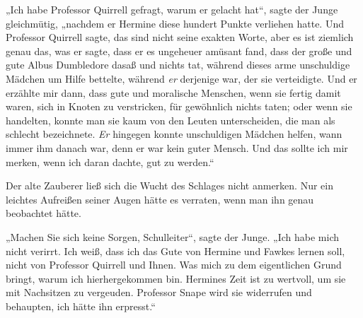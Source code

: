 „Ich habe Professor Quirrell gefragt, warum er gelacht hat“, sagte der Junge gleichmütig, „nachdem er Hermine diese hundert Punkte verliehen hatte. Und Professor Quirrell sagte, das sind nicht seine exakten Worte, aber es ist ziemlich genau das, was er sagte, dass er es ungeheuer amüsant fand, dass der große und gute Albus Dumbledore dasaß und nichts tat, während dieses arme unschuldige Mädchen um Hilfe bettelte, während \emph{er} derjenige war, der sie verteidigte. Und er erzählte mir dann, dass gute und moralische Menschen, wenn sie fertig damit waren, sich in Knoten zu verstricken, für gewöhnlich nichts taten; oder wenn sie handelten, konnte man sie kaum von den Leuten unterscheiden, die man als schlecht bezeichnete. \emph{Er} hingegen konnte unschuldigen Mädchen helfen, wann immer ihm danach war, denn er war kein guter Mensch. Und das sollte ich mir merken, wenn ich daran dachte, gut zu werden.“

Der alte Zauberer ließ sich die Wucht des Schlages nicht anmerken. Nur ein leichtes Aufreißen seiner Augen hätte es verraten, wenn man ihn genau beobachtet hätte.

„Machen Sie sich keine Sorgen, Schulleiter“, sagte der Junge. „Ich habe mich nicht verirrt. Ich weiß, dass ich das Gute von Hermine und Fawkes lernen soll, nicht von Professor Quirrell und Ihnen. Was mich zu dem eigentlichen Grund bringt, warum ich hierhergekommen bin. Hermines Zeit ist zu wertvoll, um sie mit Nachsitzen zu vergeuden. Professor Snape wird sie widerrufen und behaupten, ich hätte ihn erpresst.“

